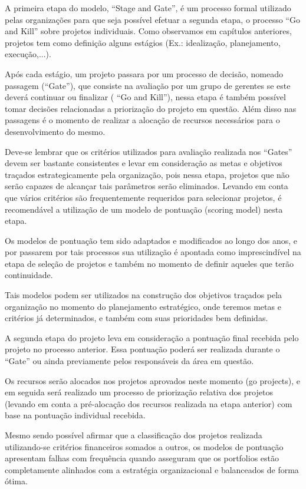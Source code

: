 \documentclass[12pt,a4paper,ruledheader,tocpage=prefix,floatnumber=continuous,pagestart=folhaderosto,font=times]{abnt}
\begin{document}
A primeira etapa do modelo, ``Stage and Gate'', é um processo formal utilizado pelas organizações para que seja possível efetuar a segunda etapa, o processo
``Go and Kill'' sobre projetos individuais. Como observamos em capítulos anteriores, projetos tem como definição alguns estágios (Ex.: idealização, planejamento,
execução,...). 

Após cada estágio, um projeto passara por um processo de decisão, nomeado passagem (``Gate''), que consiste na avaliação por um grupo de gerentes se este 
deverá continuar ou finalizar ( ``Go and Kill''), nessa etapa é também possível tomar decisões relacionadas a priorização do projeto em questão. Além disso
nas passagens é o momento de realizar a alocação de recursos necessários para o desenvolvimento do mesmo.

Deve-se lembrar que os critérios utilizados para avaliação realizada nos ``Gates'' devem ser bastante consistentes e levar em consideração as metas e objetivos
traçados estrategicamente pela organização, pois nessa etapa, projetos que não serão capazes de alcançar tais parâmetros serão eliminados. Levando em conta
que vários critérios são frequentemente requeridos para selecionar projetos, é recomendável a utilização de um modelo de pontuação (scoring model) nesta etapa.

Os modelos de pontuação tem sido adaptados e modificados ao longo dos anos, e por passarem por tais processos sua utilização é apontada como imprescindível 
na etapa de seleção de projetos e também no momento de definir aqueles que terão continuidade. 

Tais modelos podem ser utilizados na construção dos objetivos traçados pela organização no momento do planejamento estratégico, onde teremos metas e 
critérios já determinados, e também com suas prioridades bem definidas.

A segunda etapa do projeto leva em consideração a pontuação final recebida pelo projeto no processo anterior. Essa pontuação poderá ser realizada durante o
``Gate'' ou ainda previamente pelos responsáveis da área em questão. 

Os recursos serão alocados nos projetos aprovados neste momento (go projects), e em seguida será realizado um processo de priorização relativa dos 
projetos (levando em conta a pré-alocação dos recursos realizada na etapa anterior) com base na pontuação individual recebida.

Mesmo sendo possível afirmar que a classificação dos projetos realizada utilizando-se critérios financeiros somados a outros, os modelos de pontuação
apresentam falhas com frequência quando asseguram que os portfolios estão completamente alinhados com a estratégia organizacional e balanceados de forma ótima.
\end{document}
